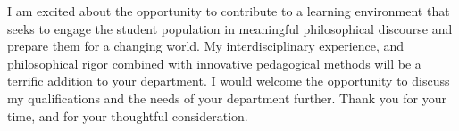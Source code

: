 \documentclass[
  letterpaper,
  DIV=11,
  numbers=noendperiod]{scrartcl}
\begin{document}
I am excited about the opportunity to contribute to a learning
environment that seeks to engage the student population in meaningful
philosophical discourse and prepare them for a changing world. My
interdisciplinary experience, and philosophical rigor combined with
innovative pedagogical methods will be a terrific addition to your
department. I would welcome the opportunity to discuss my qualifications
and the needs of your department further. Thank you for your time, and
for your thoughtful consideration.
\end{document}
